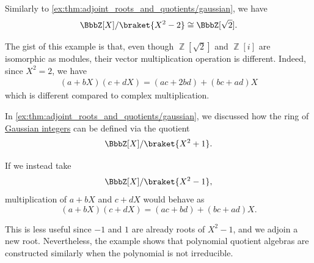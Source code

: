 \begin{example}
\begin{thmenum}
     Similarly to \cref{ex:thm:adjoint_roots_and_quotients/gaussian}, we have
    \begin{equation*}
      \BbbZ[X] / \braket{X^2 - 2} \cong \BbbZ[\sqrt 2].
    \end{equation*}

    The gist of this example is that, even though \( \BbbZ[\sqrt 2] \) and \( \BbbZ[i] \) are isomorphic as modules, their vector multiplication operation is different. Indeed, since \( X^2 = 2 \), we have
    \begin{align*}
      (a + bX) (c + dX) = (ac + 2bd) + (bc + ad)X
    \end{align*}
    which is different compared to complex multiplication.

     In \cref{ex:thm:adjoint_roots_and_quotients/gaussian}, we discussed how the ring of \hyperref[def:gaussian_integers]{Gaussian integers} can be defined via the quotient
    \begin{equation*}
      \BbbZ[X] / \braket{ X^2 + 1 }.
    \end{equation*}

    If we instead take
    \begin{equation*}
      \BbbZ[X] / \braket{ X^2 - 1 },
    \end{equation*}
    multiplication of \( a + bX \) and \( c + dX \) would behave as
    \begin{equation*}
      (a + bX) (c + dX) = (ac + bd) + (bc + ad)X.
    \end{equation*}

    This is less useful since \( -1 \) and \( 1 \) are already roots of \( X^2 - 1 \), and we adjoin a new root. Nevertheless, the example shows that polynomial quotient algebras are constructed similarly when the polynomial is not irreducible.
  \end{thmenum}
\end{example}

